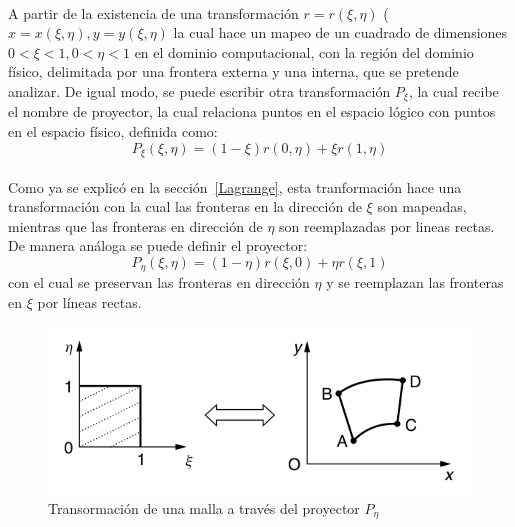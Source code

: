 \documentclass[letterpaper, openright, 12pt]{book}
\begin{document}
    \paragraph*{}
        A partir de la existencia de una transformación $r = r(\xi, \eta)$
        ($x = x(\xi, \eta), y = y(\xi, \eta)$ la cual hace un mapeo de un
        cuadrado de dimensiones $0 < \xi < 1, 0 < \eta < 1$ en el dominio
        computacional, con la región del dominio físico, delimitada por una
        frontera externa y una interna, que se pretende analizar.
        De igual modo, se puede escribir otra transformación $P_{\xi}$,
        la cual recibe el nombre de proyector, la cual relaciona puntos en el
        espacio lógico con puntos en el espacio físico, definida como:
        \begin{equation}
            P_{\xi}(\xi, \eta) = (1 - \xi)r(0, \eta) + \xi r(1, \eta)
        \end{equation}
    \paragraph*{}
        Como ya se explicó en la sección~\ref{Lagrange}, esta tranformación hace
        una transformación con la cual las fronteras en la dirección de $\xi$
        son mapeadas, mientras que las fronteras en dirección de $\eta$ son
        reemplazadas por lineas rectas. De manera análoga se puede definir el
        proyector:
        \begin{equation}
            P_{\eta}(\xi, \eta) = (1 - \eta)r(\xi, 0) + \eta r(\xi, 1)
        \end{equation}
        con el cual se preservan las fronteras en dirección $\eta$ y se
        reemplazan las fronteras en $\xi$ por líneas rectas.
        \begin{figure}[htbp!]
            \centering
            \includegraphics[keepaspectratio, width=120mm]{./Imagenes/mapeo_eta}
            \caption[Transformación de malla por $P_{\eta}$]{Transormación de
            una malla a través del proyector $P_{\eta}$ \cite{farrashkhalvat}}
            \label{fig:mapeo_eta}
        \end{figure}
\end{document}
